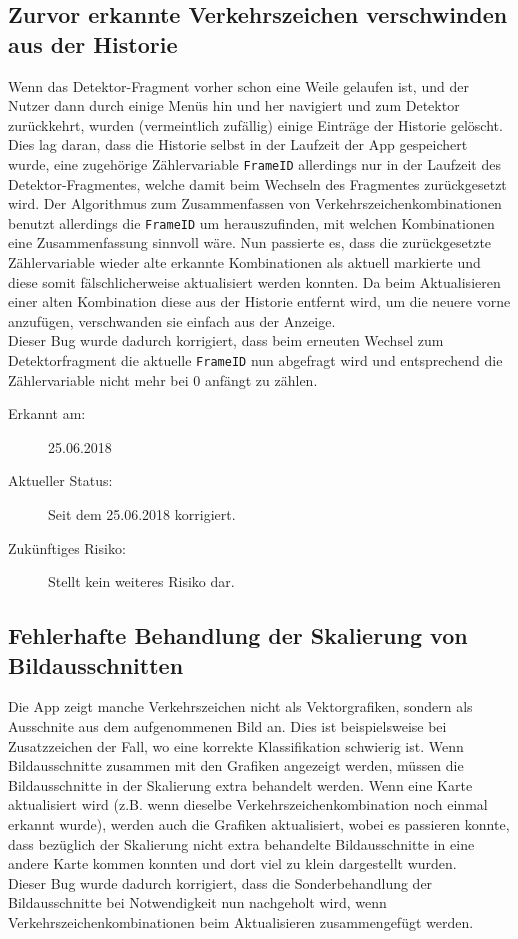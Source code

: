 \documentclass[12pt,a4paper,ngerman,enabledeprecatedfontcommands]{scrreprt}
\begin{document}
\subsection{Zurvor erkannte Verkehrszeichen verschwinden aus der Historie}
Wenn das Detektor-Fragment vorher schon eine Weile gelaufen ist, und der \gls{Nutzer} dann durch einige Menüs hin und her navigiert und zum Detektor zurückkehrt, wurden (vermeintlich zufällig) einige Einträge der Historie gelöscht. Dies lag daran, dass die Historie selbst in der Laufzeit der \gls{App} gespeichert wurde, eine zugehörige Zählervariable \texttt{FrameID} allerdings nur in der Laufzeit des Detektor-Fragmentes, welche damit beim Wechseln des Fragmentes zurückgesetzt wird.
Der Algorithmus zum Zusammenfassen von Verkehrszeichenkombinationen benutzt allerdings die \texttt{FrameID} um herauszufinden, mit welchen Kombinationen eine Zusammenfassung sinnvoll wäre. Nun passierte es, dass die zurückgesetzte Zählervariable wieder alte erkannte Kombinationen als aktuell markierte und diese somit fälschlicherweise aktualisiert werden konnten. Da beim Aktualisieren einer alten Kombination diese aus der Historie entfernt wird, um die neuere vorne anzufügen, verschwanden sie einfach aus der Anzeige.\\
Dieser Bug wurde dadurch korrigiert, dass beim erneuten Wechsel zum Detektorfragment die aktuelle \texttt{FrameID} nun abgefragt wird und entsprechend die Zählervariable nicht mehr bei 0 anfängt zu zählen.

\begin{description}

    \item[Erkannt am:] 25.06.2018
    
    \item[Aktueller Status:] Seit dem 25.06.2018 korrigiert.
    
    \item[Zukünftiges Risiko:] Stellt kein weiteres Risiko dar.
    
\end{description}
\smallskip

\subsection{Fehlerhafte Behandlung der Skalierung von Bildausschnitten}
Die \gls{App} zeigt manche Verkehrszeichen nicht als Vektorgrafiken, sondern als Ausschnite aus dem aufgenommenen Bild an. Dies ist beispielsweise bei Zusatzzeichen der Fall, wo eine korrekte \gls{Klassifikation} schwierig ist. Wenn Bildausschnitte zusammen mit den Grafiken angezeigt werden, müssen die Bildausschnitte in der Skalierung extra behandelt werden. Wenn eine Karte aktualisiert wird (z.B. wenn dieselbe \gls{Verkehrszeichenkombination} noch einmal erkannt wurde), werden auch die Grafiken aktualisiert, wobei es passieren konnte, dass bezüglich der Skalierung nicht extra behandelte Bildausschnitte in eine andere Karte kommen konnten und dort viel zu klein dargestellt wurden.\\
Dieser Bug wurde dadurch korrigiert, dass die Sonderbehandlung der Bildausschnitte bei Notwendigkeit nun nachgeholt wird, wenn \gls{Verkehrszeichenkombination}en beim Aktualisieren zusammengefügt werden.
\end{document}
